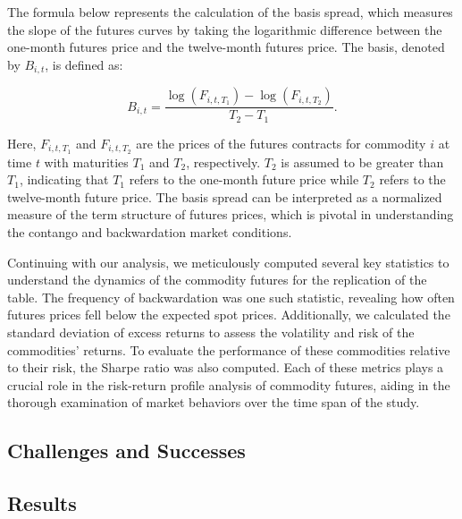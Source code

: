 \documentclass{article}
\begin{document}
The formula below represents the calculation of the basis spread, which measures the slope of the futures curves by taking the logarithmic difference between the one-month futures price and the twelve-month futures price. The basis, denoted by \( B_{i,t} \), is defined as:

\[
B_{i,t} = \frac{\log(F_{i,t,T_1}) - \log(F_{i,t,T_2})}{T_2 - T_1}.
\]

Here, \( F_{i,t,T_1} \) and \( F_{i,t,T_2} \) are the prices of the futures contracts for commodity \( i \) at time \( t \) with maturities \( T_1 \) and \( T_2 \), respectively. \( T_2 \) is assumed to be greater than \( T_1 \), indicating that \( T_1 \) refers to the one-month future price while \( T_2 \) refers to the twelve-month future price. The basis spread can be interpreted as a normalized measure of the term structure of futures prices, which is pivotal in understanding the contango and backwardation market conditions.

Continuing with our analysis, we meticulously computed several key statistics to understand the dynamics of the commodity futures for the replication of the table. The frequency of backwardation was one such statistic, revealing how often futures prices fell below the expected spot prices. Additionally, we calculated the standard deviation of excess returns to assess the volatility and risk of the commodities' returns. To evaluate the performance of these commodities relative to their risk, the Sharpe ratio was also computed. Each of these metrics plays a crucial role in the risk-return profile analysis of commodity futures, aiding in the thorough examination of market behaviors over the time span of the study.

\subsection{Challenges and Successes}


\subsection{Results}
\end{document}
